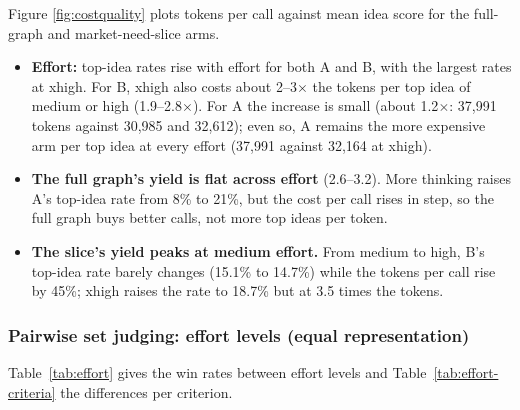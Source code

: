 Figure \ref{fig:costquality} plots tokens per call against mean idea score for the full-graph and market-need-slice arms.


\begin{itemize}
\tightlist
\item
  \textbf{Effort:} top-idea rates rise with effort for both A and B, with the largest rates at xhigh. For B, xhigh also costs about 2--3$\times$ the tokens per top idea of medium or high (1.9--2.8$\times$). For A the increase is small (about 1.2$\times$: 37,991 tokens against 30,985 and 32,612); even so, A remains the more expensive arm per top idea at every effort (37,991 against 32,164 at xhigh).
\item
  \textbf{The full graph's yield is flat across effort} (2.6--3.2). More thinking raises A's top-idea rate from 8\% to 21\%, but the cost per call rises in step, so the full graph buys better calls, not more top ideas per token.
\item
  \textbf{The slice's yield peaks at medium effort.} From medium to high, B's top-idea rate barely changes (15.1\% to 14.7\%) while the tokens per call rise by 45\%; xhigh raises the rate to 18.7\% but at 3.5 times the tokens.
\end{itemize}

\hypertarget{pairwise-set-judging-effort-levels-equal-condition}{%
\subsubsection{Pairwise set judging: effort levels (equal representation)}\label{pairwise-set-judging-effort-levels-equal-condition}}

Table~\ref{tab:effort} gives the win rates between effort levels and Table~\ref{tab:effort-criteria} the differences per criterion.

